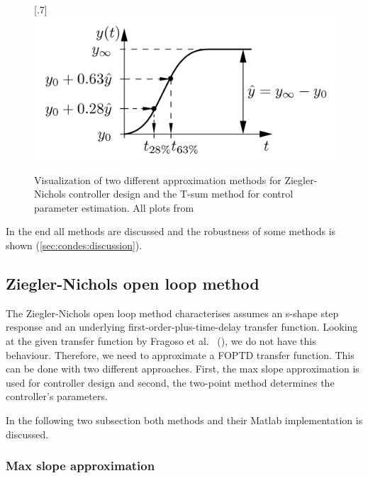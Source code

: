 \begin{figure}[H]
\\
[.7\textwidth]{\includegraphics[width=1\linewidth]{fig/Dissli_Kienle_two_point_2023.png}}
    \caption{Visualization of two different approximation methods for Ziegler-Nichols controller design and the T-sum method for control parameter estimation. All plots from \cite{Dissli_Kienle_2023}}
    \label{fig:condes:different_methods}
\end{figure}



In the end all methods are discussed and the robustness of some methods is shown (\autoref{sec:condes:discussion}).



\subsection{Ziegler-Nichols open loop method}\label{sec:condes:ZN}

The Ziegler-Nichols open loop method characterises assumes an s-shape step response and an underlying first-order-plus-time-delay transfer function.
Looking at the given transfer function by Fragoso et al.~ (\cite[Table 2]{Fragoso_et_al_2017}), we do not have this behaviour.
Therefore, we need to approximate a FOPTD transfer function.
This can be done with two different approaches.
First, the max slope approximation is used for controller design and second, the two-point method determines the controller's parameters.

In the following two subsection both methods and their Matlab implementation is discussed. 


\subsubsection{Max slope approximation} \label{sec:condes:ZN:maxS}

